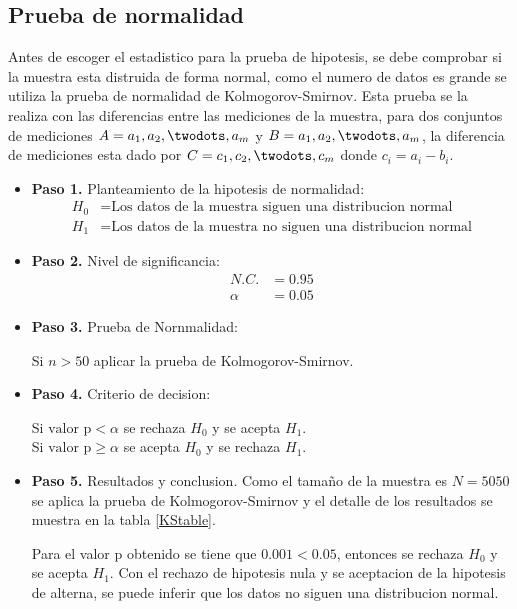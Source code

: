 \subsection{Prueba de normalidad}
Antes de escoger el estadistico para la prueba de hipotesis, se debe comprobar si la muestra esta distruida de forma normal, como el numero de datos es grande se utiliza la prueba de normalidad de Kolmogorov-Smirnov. Esta prueba se la realiza con las diferencias entre las mediciones de la muestra, para dos conjuntos de mediciones $A={a_1,a_2,\twodots,a_m}$ y $B={a_1,a_2,\twodots,a_m}$, la diferencia de mediciones esta dado por $C={c_1,c_2,\twodots,c_m}$ donde $c_i = a_i - b_i$.
\begin{itemize}
  \item[] \textbf{Paso 1.} Planteamiento de la hipotesis de normalidad:
  \begin{equation*}
  \begin{split}
  H_0 & = \text{Los datos de la muestra siguen una distribucion normal}\\
  H_1 & = \text{Los datos de la muestra no siguen una distribucion normal}
  \end{split}
  \end{equation*}
  \item[] \textbf{Paso 2.} Nivel de significancia:
  \begin{equation*}
  \begin{split}
  N.C. & = 0.95 \\
  \alpha & = 0.05
  \end{split}
  \end{equation*}
  \item[] \textbf{Paso 3.} Prueba de Nornmalidad:
  \begin{center}
  Si $n > 50$ aplicar la prueba de Kolmogorov-Smirnov.
  \end{center}
  \item[] \textbf{Paso 4.} Criterio de decision:
  \begin{center}
  Si $\text{valor p} < \alpha$ se rechaza $H_0$ y se acepta $H_1$.\\
  Si $\text{valor p} \geq \alpha$ se acepta $H_0$ y se rechaza $H_1$.
  \end{center}
  \item[] \textbf{Paso 5.} Resultados y conclusion.
  Como el tamaño de la muestra es $N=5050$ se aplica la prueba de Kolmogorov-Smirnov y el detalle de los resultados se muestra en la tabla \ref{KStable}.
  
  Para el valor p obtenido se tiene que $0.001 < 0.05$, entonces se rechaza $H_0$ y se acepta $H_1$. Con el rechazo de hipotesis nula y se aceptacion de la hipotesis de alterna, se puede inferir que los datos no siguen una distribucion normal.
\end{itemize}

